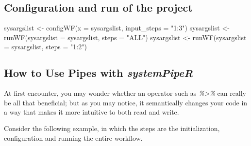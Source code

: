 \documentclass[14pt,]{article}
\newcommand{\hlstr}[1]{\textcolor[rgb]{0.251,0.627,0.251}{#1}}%
\newcommand{\hlopt}[1]{\textcolor[rgb]{0,0,0}{#1}}%
\newcommand{\hlstd}[1]{\textcolor[rgb]{0.251,0.251,0.251}{#1}}%
\newcommand{\hlkwc}[1]{\textcolor[rgb]{0.251,0.251,0.251}{#1}}%
\newcommand{\hlkwd}[1]{\textcolor[rgb]{0.878,0.439,0.125}{#1}}%
\newenvironment{Shaded}{\begin{myshaded}}{\end{myshaded}}
\newcommand{\KeywordTok}[1]{\hlkwd{#1}}
\newcommand{\DataTypeTok}[1]{\hlkwc{#1}}
\newcommand{\StringTok}[1]{\hlstr{#1}}
\newcommand{\OperatorTok}[1]{\hlopt{#1}}
\newcommand{\NormalTok}[1]{\hlstd{#1}}
\begin{document}
\hypertarget{configuration-and-run-of-the-project}{%
\subsection{Configuration and run of the project}\label{configuration-and-run-of-the-project}}

\begin{Shaded}
\begin{Highlighting}[]
\NormalTok{sysargslist <-}\StringTok{ }\KeywordTok{configWF}\NormalTok{(}\DataTypeTok{x =}\NormalTok{ sysargslist, }\DataTypeTok{input_steps =} \StringTok{"1:3"}\NormalTok{)}
\NormalTok{sysargslist <-}\StringTok{ }\KeywordTok{runWF}\NormalTok{(}\DataTypeTok{sysargslist =}\NormalTok{ sysargslist, }\DataTypeTok{steps =} \StringTok{"ALL"}\NormalTok{)}
\NormalTok{sysargslist <-}\StringTok{ }\KeywordTok{runWF}\NormalTok{(}\DataTypeTok{sysargslist =}\NormalTok{ sysargslist, }\DataTypeTok{steps =} \StringTok{"1:2"}\NormalTok{)}
\end{Highlighting}
\end{Shaded}

\hypertarget{how-to-use-pipes-with-systempiper}{%
\subsection{\texorpdfstring{How to Use Pipes with \emph{systemPipeR}}{How to Use Pipes with systemPipeR}}\label{how-to-use-pipes-with-systempiper}}

At first encounter, you may wonder whether an operator such as \emph{\%\textgreater{}\%} can really be all that beneficial; but as you may notice, it semantically changes your code in a way that makes it more intuitive to both read and write.

Consider the following example, in which the steps are the initialization, configuration and running the entire workflow.

\begin{Shaded}
\end{Shaded}
\end{document}
